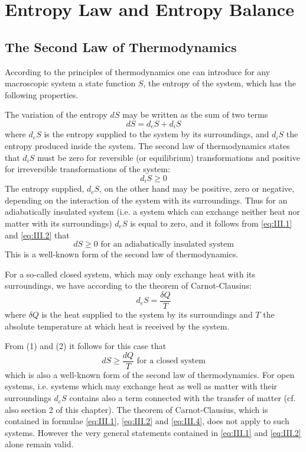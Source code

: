 \chapter{Entropy Law and Entropy Balance}
\section{The Second Law of Thermodynamics}

According to the principles of thermodynamics one can introduce for
any macroscopic system a state function $S$, the entropy of the system,
which has the following properties.

The variation of the entropy $dS$ may be written as the sum of two
terms
\begin{equation}
dS = d_e S + d_i S
    \label{eq:III.1}
\end{equation}
where $d_e S$ is the entropy supplied to the system by its surroundings, and $d_i S$ the entropy produced inside the system. The second law of thermodynamics states that $d_i S$ must be zero for reversible (or equilibrium) transformations and positive for irreversible transformations of the system:
\begin{equation}
d_i S \geq 0
    \label{eq:III.2}
\end{equation}
The entropy supplied, $d_e S$, on the other hand may be positive, zero or negative, depending on the interaction of the system with its surroundings. Thus for an adiabatically insulated system (i.e. a system
which can exchange neither heat nor matter with its surroundings)
$d_e S$ is equal to zero, and it follows from \eqref{eq:III.1} and \eqref{eq:III.2} that
\begin{equation}
d S \geq 0 \textrm{ for an adiabatically insulated system}
    \label{eq:III.3}
\end{equation}
This is a well-known form of the second law of thermodynamics.

For a so-called closed system, which may only exchange heat with
its surroundings, we have according to the theorem of Carnot-Clausius:
\begin{equation}
d_e S = \frac{\delta Q}{T}
    \label{eq:III.4}
\end{equation}
where $\delta Q$ is the heat supplied to the system by its surroundings and $T$ the absolute temperature at which heat is received by the system.

From (1) and (2) it follows for this case that
\begin{equation}
dS \geq \frac{dQ}{T} \textrm{ for a closed system}
    \label{eq:III.5}
\end{equation}
which is also a well-known form of the second law of thermodynamics.
For open systems, i.e. systems which may exchange heat as well as
matter with their surroundings $d_e S$ contains also a term connected
with the transfer of matter (cf. also section 2 of this chapter). The theorem of Carnot-Clausius, which is contained in formulae \eqref{eq:III.1}, \eqref{eq:III.2} and \eqref{eq:III.4}, does
not apply to such systems. However the very general statements
contained in \eqref{eq:III.1} and \eqref{eq:III.2} alone remain valid.

